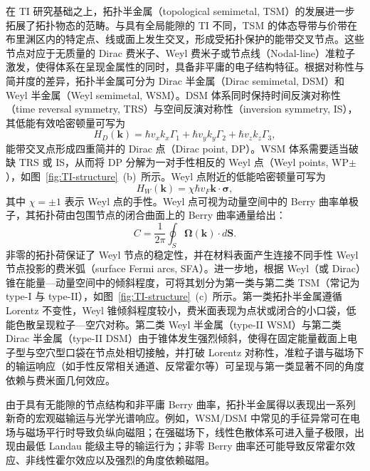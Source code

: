 在 TI 研究基础之上，拓扑半金属（topological semimetal, TSM）的发展进一步拓展了拓扑物态的范畴。与具有全局能隙的 TI 不同，TSM 的体态导带与价带在布里渊区内的特定点、线或面上发生交叉，形成受拓扑保护的能带交叉节点。这些节点对应于无质量的 Dirac 费米子、Weyl 费米子或节点线（Nodal-line）准粒子激发，使得体系在呈现金属性的同时，具备非平庸的电子结构特征\cite{Armitage2018RevModPhys}。根据对称性与简并度的差异，拓扑半金属可分为 Dirac 半金属（Dirac semimetal, DSM）和 Weyl 半金属（Weyl semimetal, WSM）。DSM 体系同时保持时间反演对称性（time reversal symmetry, TRS）与空间反演对称性（inversion symmetry, IS），其低能有效哈密顿量可写为
\begin{equation}
H_D(\mathbf{k})=\hbar v_x k_x \Gamma_1+\hbar v_y k_y \Gamma_2+\hbar v_z k_z \Gamma_3,
\end{equation}
能带交叉点形成四重简并的 Dirac 点（Dirac point, DP）。WSM 体系需要适当破缺 TRS 或 IS，从而将 DP 分解为一对手性相反的 Weyl 点（Weyl points, WP$\pm$），如图~\ref{fig:TI-structure}~(b)~所示。Weyl 点附近的低能哈密顿量可写为
\begin{equation}
H_W(\mathbf{k})=\chi \hbar v_F \mathbf{k}\cdot\boldsymbol{\sigma},
\end{equation}
其中 \(\chi=\pm 1\) 表示 Weyl 点的手性。Weyl 点可视为动量空间中的 Berry 曲率单极子，其拓扑荷由包围节点的闭合曲面上的 Berry 曲率通量给出：
\begin{equation}
C=\frac{1}{2\pi}\oint_S \mathbf{\Omega}(\mathbf{k})\cdot d\mathbf{S}.
\end{equation}
非零的拓扑荷保证了 Weyl 节点的稳定性，并在材料表面产生连接不同手性 Weyl 节点投影的费米弧（surface Fermi arcs, SFA）\cite{wanTopologicalSemimetalFermi2011,Armitage2018RevModPhys}。进一步地，根据 Weyl（或 Dirac）锥在能量—动量空间中的倾斜程度，可将其划分为第一类与第二类 TSM（常记为 type-I 与 type-II），如图~\ref{fig:TI-structure}~(c)~所示。第一类拓扑半金属遵循 Lorentz 不变性，Weyl 锥倾斜程度较小，费米面表现为点状或闭合的小口袋，低能色散呈现粒子—空穴对称。第二类 Weyl 半金属（type-II WSM）与第二类 Dirac 半金属（type-II DSM）由于锥体发生强烈倾斜，使得在固定能量截面上电子型与空穴型口袋在节点处相切接触，并打破 Lorentz 对称性，准粒子谱与磁场下的输运响应（如手性反常相关通道、反常霍尔等）可呈现与第一类显著不同的角度依赖与费米面几何效应。


由于具有无能隙的节点结构和非平庸 Berry 曲率，拓扑半金属得以表现出一系列新奇的宏观磁输运与光学光谱响应。例如，WSM/DSM 中常见的手征异常可在电场与磁场平行时导致负纵向磁阻；在强磁场下，线性色散体系可进入量子极限，出现由最低 Landau 能级主导的输运行为；非零 Berry 曲率还可能导致反常霍尔效应、非线性霍尔效应以及强烈的角度依赖磁阻\cite{huangObservationChiralAnomaly2015,liChiralmagneticeffect2016,liangUltrahighMobilityGiant2015}。

